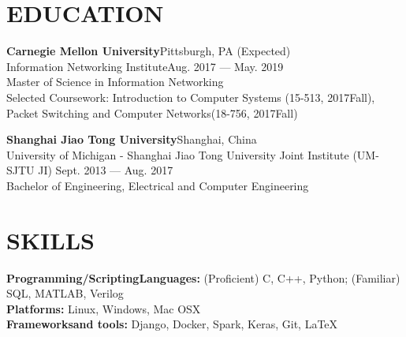 \documentclass[margin,line,letterpaper]{res}
\begin{document}
\address{ $\bullet$ linkedin.com/in/hao-wu-710254128 $\bullet$ wu.hao.cz.21@gmail.com $\bullet$ (412)-616-6280}
\vspace{-.1 in}
\begin{resume}

\section{EDUCATION}
{
\small
\textbf{Carnegie Mellon University}\hfill Pittsburgh, PA (Expected) \\ Information Networking Institute\hfill Aug. 2017 --- May. 2019\\
Master of Science in Information Networking\\
{\small Selected Coursework: Introduction to Computer Systems (15-513, 2017Fall), Packet Switching and Computer Networks(18-756, 2017Fall)} 
}
\vspace{-.1 in}

{
\small
\textbf{Shanghai Jiao Tong University}\hfill Shanghai, China \\
University of Michigan - Shanghai Jiao Tong University Joint Institute (UM-SJTU JI) \hfill Sept. 2013 --- Aug. 2017\\
Bachelor of Engineering, Electrical and Computer Engineering
}
\vspace{-.05 in}
\section{SKILLS}
{\small \textbf{Programming/ScriptingLanguages:} (Proficient) C, C++, Python; (Familiar) SQL, MATLAB, Verilog}\\
{\small \textbf{Platforms:} Linux, Windows, Mac OSX}\\
{\small \textbf{Frameworksand tools:} Django, Docker, Spark, Keras, Git, \LaTeX}
\vspace{-.05 in}

\end{resume}
\end{document}
